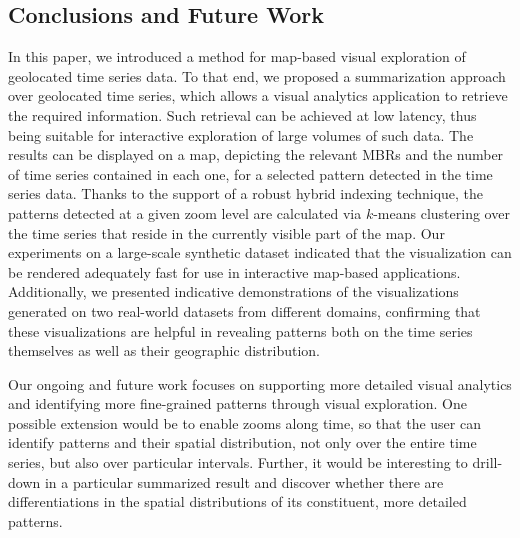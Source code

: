 \subsection{Conclusions and Future Work}
\label{sec:conclusions}

In this paper, we introduced a method for map-based visual exploration of geolocated time series data. To that end, we proposed a summarization approach over geolocated time series, which allows a visual analytics application to retrieve the required information. Such retrieval can be achieved at low latency, thus being suitable for interactive exploration of large volumes of such data. The results can be displayed on a map, depicting the relevant MBRs and the number of time series contained in each one, for a selected pattern detected in the time series data. Thanks to the support of a robust hybrid indexing technique, the patterns detected at a given zoom level are calculated via $k$-means clustering over the time series that reside in the currently visible part of the map. Our experiments on a large-scale synthetic dataset indicated that the visualization can be rendered adequately fast for use in interactive map-based applications. Additionally, we presented indicative demonstrations of the visualizations generated on two real-world datasets from different domains, confirming that these visualizations are helpful in revealing patterns both on the time series themselves as well as their geographic distribution. 

Our ongoing and future work focuses on supporting more detailed visual analytics and identifying more fine-grained patterns through visual exploration. One possible extension would be to enable zooms along time, so that the user can identify patterns and their spatial distribution, not only over the entire time series, but also over particular intervals. Further, it would be interesting to drill-down in a particular summarized result and discover whether there are differentiations in the spatial distributions of its constituent, more detailed patterns.